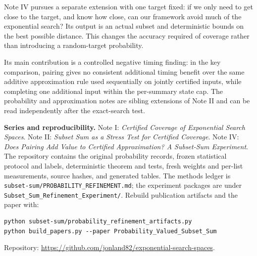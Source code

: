 \documentclass[10pt,english]{article}
\begin{document}
Note IV pursues a separate extension with one target fixed: if we only need to get close to the target, and know how close, can our framework avoid much of the exponential search? Its output is an actual subset and deterministic bounds on the best possible distance. This changes the accuracy required of coverage rather than introducing a random-target probability.

Its main contribution is a controlled negative timing finding: in the key comparison, pairing gives no consistent additional timing benefit over the same additive approximation rule used sequentially on jointly certified inputs, while completing one additional input within the per-summary state cap. The probability and approximation notes are sibling extensions of Note II and can be read independently after the exact-search test.

\vspace{.4em}
\noindent\textbf{Series and reproducibility.} Note I: \emph{Certified Coverage of Exponential Search Spaces}. Note II: \emph{Subset Sum as a Stress Test for Certified Coverage}. Note IV: \emph{Does Pairing Add Value to Certified Approximation? A Subset-Sum Experiment}. The repository contains the original probability records, frozen statistical protocol and labels, deterministic theorem and tests, fresh weights and per-list measurements, source hashes, and generated tables. The methods ledger is \texttt{subset-sum/PROBABILITY\_REFINEMENT.md}; the experiment packages are under \texttt{Subset\_Sum\_Refinement\_Experiment/}. Rebuild publication artifacts and the paper with:
\begin{verbatim}
python subset-sum/probability_refinement_artifacts.py
python build_papers.py --paper Probability_Valued_Subset_Sum
\end{verbatim}
Repository: \url{https://github.com/jonland82/exponential-search-spaces}.
\end{document}

